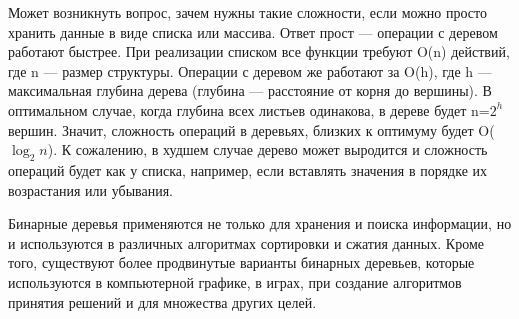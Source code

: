 Может возникнуть вопрос, зачем нужны такие сложности, если можно просто хранить данные в виде списка или массива. Ответ прост — операции с деревом работают быстрее. При реализации списком все функции требуют O(n) действий, где n — размер структуры. Операции с деревом же работают за O(h), где h — максимальная глубина дерева (глубина — расстояние от корня до вершины). В оптимальном случае, когда глубина всех листьев одинакова, в дереве будет n=$2^{h}$ вершин. Значит, сложность операций в деревьях, близких к оптимуму будет O($\log_{2} n$). К сожалению, в худшем случае дерево может выродится и сложность операций будет как у списка, например, если вставлять значения в порядке их возрастания или убывания.


Бинарные деревья применяются не только для хранения и поиска информации, но и используются в различных алгоритмах сортировки и сжатия данных. Кроме того, существуют более продвинутые варианты бинарных деревьев, которые используются в компьютерной графике, в играх, при создание алгоритмов принятия решений и для множества других целей.